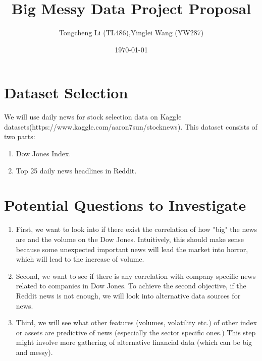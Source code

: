 \documentclass[a4paper]{article}
\title{Big Messy Data Project Proposal}
\author{Tongcheng Li (TL486),Yinglei Wang (YW287)}
\date{\today}
\begin{document}
\maketitle

\section{Dataset Selection}

We will use daily news for stock selection data on Kaggle datasets\newline (https://www.kaggle.com/aaron7sun/stocknews). \newline\newline
This dataset consists of two parts:
\begin{enumerate}
\item Dow Jones Index.
\item Top 25 daily news headlines in Reddit. 
\end{enumerate}
\section{Potential Questions to Investigate}
\begin{enumerate}
\item First, we want to look into if there exist the correlation of how "big" the news are and the volume on the Dow Jones.\newline
Intuitively, this should make sense because some unexpected important news will lead the market into horror, which will lead to the increase of volume.
\item Second, we want to see if there is any correlation with company specific news related to companies in Dow Jones.\newline
To achieve the second objective, if the Reddit news is not enough, we will look into alternative data sources for news.
\item Third, we will see what other features (volumes, volatility etc.) of other index or assets are predictive of news (especially the sector specific ones.)\newline
This step might involve more gathering of alternative financial data (which can be big and messy).\newline

\end{enumerate}
\end{document}
